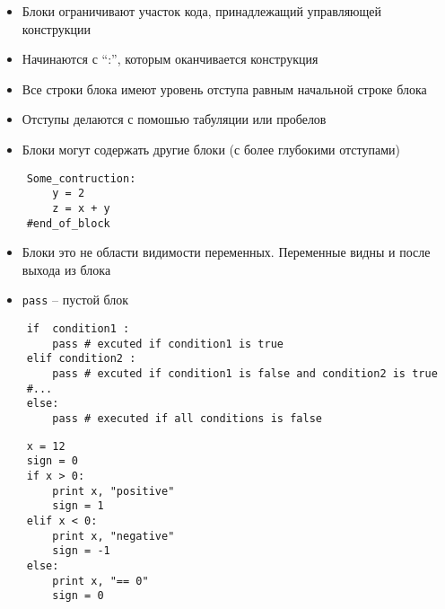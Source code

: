\documentclass{article}
\begin{document}
\LARGE

\begin{itemize}
    \item Блоки ограничивают участок кода, принадлежащий управляющей конструкции
    \item Начинаются с “:”, которым оканчивается конструкция 
    \item Все строки блока имеют уровень отступа равным начальной строке блока
    \item Отступы делаются с помошью табуляции или пробелов
    \item Блоки могут содержать другие блоки (с более глубокими отступами)
\end{itemize}
\vspace{15pt}
\begin{lstlisting}
    Some_contruction:
        y = 2
        z = x + y
    #end_of_block
\end{lstlisting}
\newpage

\begin{itemize}
    \item Блоки это не области видимости переменных. Переменные видны и после выхода из блока
    \item \lstinline$pass$ – пустой блок
\end{itemize}
\newpage

\vspace{15pt}
\begin{lstlisting}
    if  condition1 :
        pass # excuted if condition1 is true
    elif condition2 :
        pass # excuted if condition1 is false and condition2 is true
    #... 
    else:
        pass # executed if all conditions is false 
\end{lstlisting}
\newpage

\vspace{15pt}
\begin{lstlisting}
    x = 12
    sign = 0
    if x > 0:
        print x, "positive"
        sign = 1
    elif x < 0:
        print x, "negative"
        sign = -1
    else:
        print x, "== 0"
        sign = 0
\end{lstlisting}
\newpage
\end{document}

